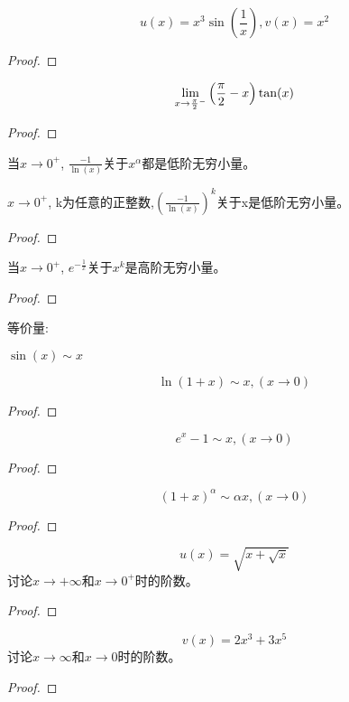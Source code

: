 \documentclass[lang=cn]{elegantbook}
\begin{document}
\begin{proposition}
    \[ u(x) = x^3\sin \left( \frac{1}{x} \right), v(x) = x^2\]
\end{proposition}
\begin{proof}
    
\end{proof}
\begin{proposition}
    \[ \lim_{x \to \frac{\pi}{2}^- } \left( \frac{\pi}{2} - x \right)\tan(x)\]
\end{proposition}
\begin{proof}
    
\end{proof}
当$x \to 0^+$, $\frac{-1}{\ln(x)}$关于$x^\alpha$都是低阶无穷小量。
\begin{proposition}
    $x \to 0^+$, k为任意的正整数,$\left( \frac{-1}{\ln(x)}\right)^k$关于x是低阶无穷小量。
\end{proposition}
\begin{proof}
    
\end{proof}
\begin{proposition}
    当$x \to 0^+$, $e^{-\frac{1}{x}}$关于$x^k$是高阶无穷小量。
\end{proposition}
\begin{proof}
    
\end{proof}

等价量:

$\sin(x) \sim x$
\begin{proposition}
    \[ \ln(1+x) \sim x, (x \to 0) \] 
\end{proposition}
\begin{proof}
    
\end{proof}
\begin{proposition}
    \[ e^x - 1 \sim x, (x \to 0)\]
\end{proposition}
\begin{proof}
    
\end{proof}
\begin{proposition}
    \[ \left( 1 + x\right)^\alpha \sim \alpha x, (x \to 0)\]
\end{proposition}
\begin{proof}
    
\end{proof}
\begin{proposition}
    \[ u(x) = \sqrt{x + \sqrt{x}}\]
    讨论$x \to +\infty$和$x \to 0^+$时的阶数。
\end{proposition}
\begin{proof}
    
\end{proof}
\begin{proposition}
    \[ v(x) = 2x^3 + 3x^5\]
    讨论$x \to \infty$和$x \to 0$时的阶数。
\end{proposition}
\begin{proof}
    
\end{proof}
\end{document}

